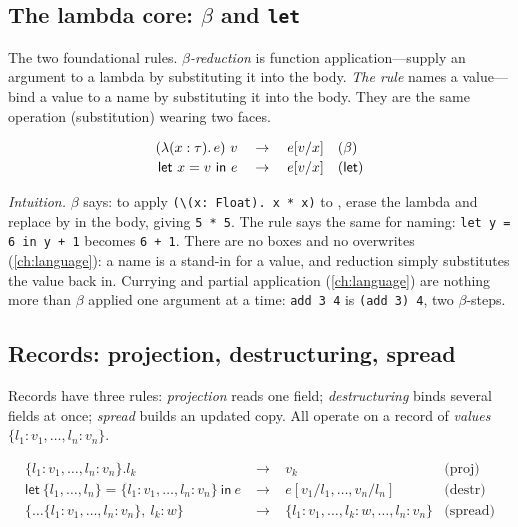 \subsection{The lambda core: \texorpdfstring{$\beta$}{beta} and \texttt{let}}
\label{app:calc:lambda}

The two foundational rules. \emph{$\beta$-reduction} is function
application---supply an argument to a lambda by substituting it into the body.
\emph{The  rule} names a value---bind a value to a name by substituting
it into the body. They are the same operation (substitution) wearing two faces.

\[
\begin{array}{rcll}
(\lambda(x:\tau).\, e)\ v &\;\to\;& e[v/x] & \text{($\beta$)} \\[2pt]
\textsf{let}\ x = v\ \textsf{in}\ e &\;\to\;& e[v/x] & \text{(\textsf{let})}
\end{array}
\]

\noindent \emph{Intuition.} $\beta$ says: to apply
\lstinline[style=l4style]|(\(x: Float). x * x)| to , erase the lambda and
replace  by  in the body, giving \lstinline[style=l4style]|5 * 5|.
The  rule says the same for naming: \lstinline[style=l4style]|let y = 6 in y + 1|
becomes \lstinline[style=l4style]|6 + 1|. There are no boxes and no overwrites
(\cref{ch:language}): a name is a stand-in for a value, and reduction simply
substitutes the value back in. Currying and partial application
(\cref{ch:language}) are nothing more than $\beta$ applied one argument at a time:
\lstinline[style=l4style]|add 3 4| is \lstinline[style=l4style]|(add 3) 4|, two
$\beta$-steps.

\subsection{Records: projection, destructuring, spread}
\label{app:calc:records}

Records have three rules: \emph{projection} reads one field; \emph{destructuring}
binds several fields at once; \emph{spread} builds an updated copy. All operate on
a record of \emph{values} $\{l_1\!:\!v_1, \dots, l_n\!:\!v_n\}$.

\[
\begin{array}{rcll}
\{l_1\!:\!v_1,\dots,l_n\!:\!v_n\}.l_k &\;\to\;& v_k & \text{(proj)} \\[3pt]
\textsf{let}\ \{l_1,\dots,l_n\} = \{l_1\!:\!v_1,\dots,l_n\!:\!v_n\}\ \textsf{in}\ e
  &\;\to\;& e[v_1/l_1,\dots,v_n/l_n] & \text{(destr)} \\[3pt]
\{\dots\{l_1\!:\!v_1,\dots,l_n\!:\!v_n\},\ l_k\!:\!w\}
  &\;\to\;& \{l_1\!:\!v_1,\dots,l_k\!:\!w,\dots,l_n\!:\!v_n\} & \text{(spread)}
\end{array}
\]

